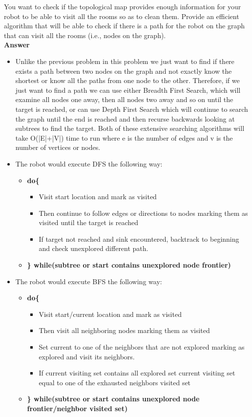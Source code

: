 \documentclass{article}
\begin{document}
 You want to check if the topological map provides
enough information for your robot to be able to visit all the rooms so
as to clean them. Provide an efficient algorithm that will be able to
check if there is a path for the robot on the graph that can visit all
the rooms (i.e., nodes on the graph).\\

\textbf{ Answer }
\begin{itemize}
\item Unlike the previous problem in this problem we just want to find if there exists a path between two nodes on the graph and not exactly know the shortest or know all the paths from one node to the other. Therefore, if we just want to find a path we can use either Breadth First Search, which will examine all nodes one away, then all nodes two away and so on until the target is reached, or can use Depth First Search which will continue to search the graph until the end is reached and then recurse backwards looking at subtrees to find the target. Both of these extensive searching algorithms will take O(|E|+|V|) time to run where e is the number of edges and v is the number of vertices or nodes. 

\item The robot would execute DFS the following way:
\begin{itemize}
\item {\bf do\{ }
\begin{itemize}
\item Visit start location and mark as visited
\item Then continue to follow edges or directions to nodes marking them as visited until the target is reached
\item If target not reached and sink encountered, backtrack to beginning and check unexplored different path.
\end{itemize}
\item {\bf \} while(subtree or start contains unexplored node frontier) }
\end{itemize}

\item The robot would execute BFS the following way:
\begin{itemize}
\item {\bf do\{ }
\begin{itemize}
\item Visit start/current location and mark as visited
\item Then visit all neighboring nodes marking them as visited
\item Set current to one of the neighbors that are not  explored marking as explored and visit its neighbors.
\item If current visiting set contains all explored set current visiting set equal to one of the exhausted neighbors visited set
\end{itemize}
\item {\bf \} while(subtree or start contains unexplored node frontier/neighbor visited set) }
\end{itemize}
\end{itemize}
\end{document}
